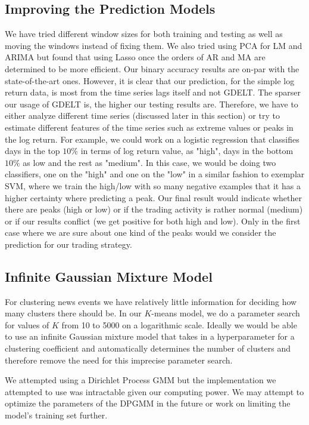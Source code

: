\subsection{Improving the Prediction Models}
We have tried different window sizes for both training and testing as well as moving the windows instead of fixing them. We also tried using PCA for LM and ARIMA but found that using Lasso once the orders of AR and MA are determined to be more efficient. Our binary accuracy results are on-par with the state-of-the-art ones. However, it is clear that our prediction, for the simple log return data, is most from the time series lags itself and not GDELT. The sparser our usage of GDELT is, the higher our testing results are. Therefore, we have to either analyze different time series (discussed later in this section) or try to estimate different features of the time series such as extreme values or peaks in the log return. For example, we could work on a logistic regression that classifies days in the top $10\%$ in terms of log return value, as "high", days in the bottom $10\%$ as low and the rest as "medium". In this case, we would be doing two classifiers, one on the "high" and one on the "low" in a similar fashion to exemplar SVM, where we train the high/low with so many negative examples that it has a higher certainty where predicting a peak. Our final result would indicate whether there are peaks (high or low) or if the trading activity is rather normal (medium) or if our results conflict (we get positive for both high and low). Only in the first case where we are sure about one kind of the peaks would we consider the prediction for our trading strategy.

\subsection{Infinite Gaussian Mixture Model}
For clustering news events we have relatively little information for deciding how many clusters there should be. In our $K$-means model, we do a parameter search for values of $K$ from 10 to 5000 on a logarithmic scale. Ideally we would be able to use an infinite Gaussian mixture model that takes in a hyperparameter for a clustering coefficient and automatically determines the number of clusters and therefore remove the need for this imprecise parameter search. 

We attempted using a Dirichlet Process GMM but the implementation we attempted to use was intractable given our computing power. We may attempt to optimize the parameters of the DPGMM in the future or work on limiting the model's training set further. 

